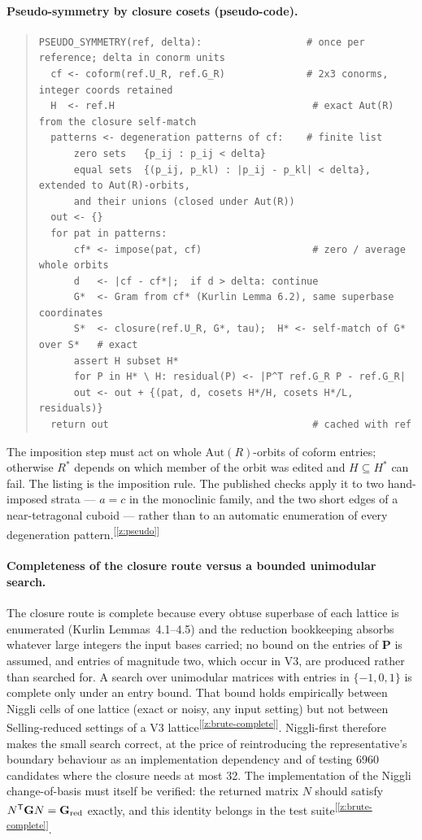 \documentclass[11pt]{article}
\newcommand{\Gmet}{\mathbf{G}}
\newcommand{\Pop}{\mathbf{P}}
\newcommand{\chk}[1]{\textsuperscript{[\ref{#1}]}}
\begin{document}
\paragraph{Pseudo-symmetry by closure cosets (pseudo-code).}
\begin{quote}\small\begin{verbatim}
PSEUDO_SYMMETRY(ref, delta):                  # once per reference; delta in conorm units
  cf <- coform(ref.U_R, ref.G_R)              # 2x3 conorms, integer coords retained
  H  <- ref.H                                  # exact Aut(R) from the closure self-match
  patterns <- degeneration patterns of cf:    # finite list
      zero sets   {p_ij : p_ij < delta}
      equal sets  {(p_ij, p_kl) : |p_ij - p_kl| < delta}, extended to Aut(R)-orbits,
      and their unions (closed under Aut(R))
  out <- {}
  for pat in patterns:
      cf* <- impose(pat, cf)                   # zero / average whole orbits
      d   <- |cf - cf*|;  if d > delta: continue
      G*  <- Gram from cf* (Kurlin Lemma 6.2), same superbase coordinates
      S*  <- closure(ref.U_R, G*, tau);  H* <- self-match of G* over S*   # exact
      assert H subset H*
      for P in H* \ H: residual(P) <- |P^T ref.G_R P - ref.G_R|
      out <- out + {(pat, d, cosets H*/H, cosets H*/L, residuals)}
  return out                                   # cached with ref
\end{verbatim}\end{quote}
The imposition step must act on whole $\mathrm{Aut}(R)$-orbits of coform entries; otherwise $R^*$ depends on which member of the orbit was edited and $H\subseteq H^*$ can fail. The listing is the imposition rule. The published checks apply it to two hand-imposed strata --- $a=c$ in the monoclinic family, and the two short edges of a near-tetragonal cuboid --- rather than to an automatic enumeration of every degeneration pattern.\chk{z:pseudo}

\paragraph{Completeness of the closure route versus a bounded unimodular search.}
The closure route is complete because every obtuse superbase of each lattice is enumerated (Kurlin Lemmas~4.1--4.5) and the reduction bookkeeping absorbs whatever large integers the input bases carried; no bound on the entries of $\Pop$ is assumed, and entries of magnitude two, which occur in V3, are produced rather than searched for. A search over unimodular matrices with entries in $\{-1,0,1\}$ is complete only under an entry bound. That bound holds empirically between Niggli cells of one lattice (exact or noisy, any input setting) but not between Selling-reduced settings of a V3 lattice\chk{z:brute-complete}. Niggli-first therefore makes the small search correct, at the price of reintroducing the representative's boundary behaviour as an implementation dependency and of testing 6960 candidates where the closure needs at most 32. The implementation of the Niggli change-of-basis must itself be verified: the returned matrix $N$ should satisfy $N^{\mathsf T}\Gmet N=\Gmet_{\rm red}$ exactly, and this identity belongs in the test suite\chk{z:brute-complete}.
\end{document}
